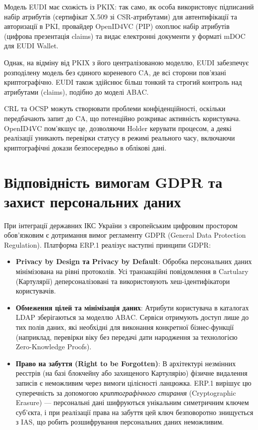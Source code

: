 Модель EUDI має схожість із PKIX: так само, як особа використовує підписаний набір атрибутів
(сертифікат X.509 зі CSR-атрибутами) для автентифікації та авторизації в PKI, провайдер
OpenID4VC (PIP) охоплює набір атрибутів (цифрова презентація claims) та видає електронні
документи у форматі mDOC для EUDI Wallet.

Однак, на відміну від PKIX з його централізованою моделлю, EUDI забезпечує розподілену модель
без єдиного кореневого CA, де всі сторони пов'язані криптографічно. EUDI також здійснює більш
тонкий та строгий контроль над атрибутами (claims), подібно до моделі ABAC.

CRL та OCSP можуть створювати проблеми конфіденційності, оскільки передбачають запит до CA, що
потенційно розкриває активність користувача. OpenID4VC пом'якшує це, дозволяючи Holder
керувати процесом, а деякі реалізації уникають перевірки статусу в режимі реального часу,
включаючи криптографічні докази безпосередньо в облікові дані.

\section{Відповідність вимогам GDPR та захист персональних даних}
При інтеграції державних ІКС України з європейським цифровим простором обов'язковим є дотримання вимог регламенту GDPR (General Data Protection Regulation). Платформа ERP.1 реалізує наступні принципи GDPR:
\begin{itemize}
    \item \textbf{Privacy by Design та Privacy by Default}: Обробка персональних даних мінімізована на рівні протоколів. Усі транзакційні повідомлення в Cartulary (Картулярії) деперсоналізовані та використовують хеш-ідентифікатори користувачів.
    \item \textbf{Обмеження цілей та мінімізація даних}: Атрибути користувача в каталогах LDAP зберігаються за моделлю ABAC. Сервіси отримують доступ лише до тих полів даних, які необхідні для виконання конкретної бізнес-функції (наприклад, перевірки віку без передачі дати народження за технологією Zero-Knowledge Proofs).
    \item \textbf{Право на забуття (Right to be Forgotten)}: В архітектурі незмінних реєстрів (на базі блокчейну або захищеного Картулярію) фізичне видалення записів є неможливим через вимоги цілісності ланцюжка. ERP.1 вирішує цю суперечність за допомогою \emph{криптографічного стирання} (Cryptographic Erasure) --- персональні дані шифруються унікальним симетричним ключем суб'єкта, і при реалізації права на забуття цей ключ безповоротно знищується з IAS, що робить розшифрування персональних даних неможливим.
\end{itemize}


